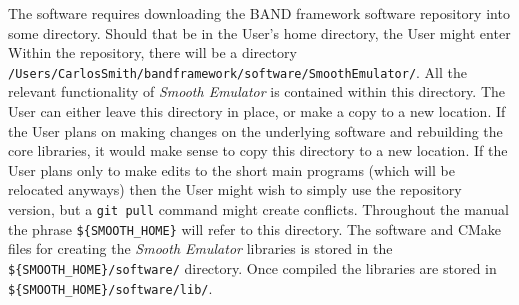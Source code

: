 \documentclass[UserManual.tex]{subfiles}
\begin{document}
The software requires downloading the BAND framework software repository into some directory. Should that be in the User's home directory, the User might enter
\vspace*{-8pt}{\tt \begin{Verbatim}[commandchars=\\\{\}]
/Users/CarlosSmith% \textcolor{darkred}{git clone https://github.com/bandframework/bandframework.git}
\end{Verbatim}
}\vspace*{-8pt}
Within the repository, there will be a directory\\{\tt /Users/CarlosSmith/bandframework/software/SmoothEmulator/}. All the relevant functionality of {\it Smooth Emulator} is contained within this directory. The User can either leave this directory in place, or make a copy to a new location. If the User plans on making changes on the underlying software and rebuilding the core libraries, it would make sense to copy this directory to a new location. If the User plans only to make edits to the short main programs (which will be relocated anyways) then the User might wish to simply use the repository version, but a {\tt git pull} command might create conflicts. Throughout the manual the phrase {\tt \$\{SMOOTH\_HOME\}} will refer to this directory. The software and CMake files for creating the {\it Smooth Emulator} libraries is stored in the {\tt \$\{SMOOTH\_HOME\}/software/} directory. Once compiled the libraries are stored in {\tt \$\{SMOOTH\_HOME\}/software/lib/}.
\end{document}
